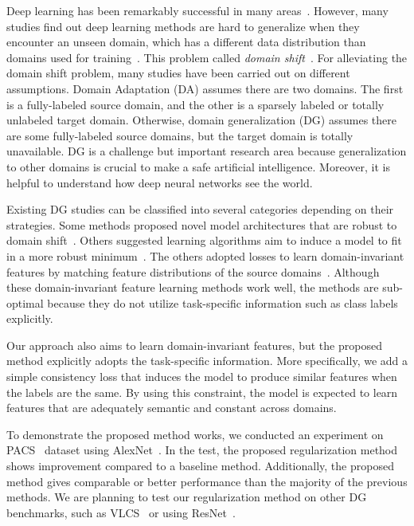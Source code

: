 Deep learning has been remarkably successful in many areas~\cite{Girshick2014, Krizhevsky2012, Ren2017, Shelhamer2017}. However, many studies find out deep learning methods are hard to generalize when they encounter an unseen domain, which has a different data distribution than domains used for training~\cite{Li2018MLDG, Li2017dg, Li2018MLDG, shankar2018generalizing, ganin2015unsupervised, bousmalis2016domain, motiian2017CCSA}. This problem called \textit{domain shift}~\cite{Shimodaira2000}. For alleviating the domain shift problem, many studies have been carried out on different assumptions. Domain Adaptation (DA) assumes there are two domains. The first is a fully-labeled source domain, and the other is a sparsely labeled or totally unlabeled target domain. Otherwise, domain generalization (DG) assumes there are some fully-labeled source domains, but the target domain is totally unavailable. DG is a challenge but important research area because generalization to other domains is crucial to make a safe artificial intelligence. Moreover, it is helpful to understand how deep neural networks see the world.

Existing DG studies can be classified into several categories depending on their strategies. Some methods proposed novel model architectures that are robust to domain shift~\cite{Khosla12undobias, Li2017dg}. Others suggested learning algorithms aim to induce a model to fit in a more robust minimum~\cite{li2019episodic, Li2018MLDG, NIPS2018_metareg}. The others adopted losses to learn domain-invariant features by matching feature distributions of the source domains~\cite{Ghifary2015mtae, muandet2013domaingeneralization, mmdaaecvpr2018}. Although these domain-invariant feature learning methods work well, the methods are sub-optimal because they do not utilize task-specific information such as class labels explicitly. 

Our approach also aims to learn domain-invariant features, but the proposed method explicitly adopts the task-specific information. More specifically, we add a simple consistency loss that induces the model to produce similar features when the labels are the same. By using this constraint, the model is expected to learn features that are adequately semantic and constant across domains.

To demonstrate the proposed method works, we conducted an experiment on PACS~\cite{Li2017dg} dataset using AlexNet~\cite{Krizhevsky2012}. In the test, the proposed regularization method shows improvement compared to a baseline method. Additionally, the proposed method gives comparable or better performance than the majority of the previous methods. We are planning to test our regularization method on other DG benchmarks, such as VLCS~\cite{chen2013vlcs} or using ResNet~\cite{He2016resnet}. 

